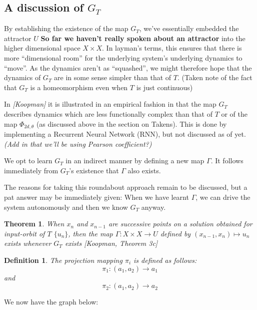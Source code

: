 \documentclass[12 pt]{article}
\newtheorem{Definition}{Definition}[]
\newtheorem{Theorem}{Theorem}[]
\begin{document}
\subsection{A discussion of $G_T$ }

By establishing the existence of the map $G_T$, we’ve essentially embedded the attractor $U$ \textbf{So far we haven't really spoken about an attractor} into the higher dimensional space $X\times{X}$.
In layman’s terms, this ensures that there is more “dimensional room” for the underlying system’s underlying dynamics to “move”. As the dynamics aren’t as “squashed”, we might therefore hope that the dynamics of $G_T$ are in some sense simpler than that of $T$. (Taken note of the fact that $G_T$ is a homeomorphism even when $T$ is just continuous)
 
In \emph{[Koopman]} it is illustrated in an empirical fashion in that the map $G_T$ describes dynamics which are less functionally complex than that of $T$ or of the map $\Phi_{2d,\theta}$ (as discussed above in the section on Takens). This is done by implementing a Recurrent Neural Network (RNN), but not discussed as of yet. \emph{(Add in that we'll be using Pearson coefficient?)}
 
We opt to learn $G_T$ in an indirect manner by defining a new map $\Gamma$. It follows immediately from $G_T$’s existence that $\Gamma$ also exists. 

The reasons for taking this roundabout approach remain to be discussed, but a pat answer may be immediately given: When we have learnt $\Gamma$, we can drive the system autonomously and then we know $G_T$ anyway.

\begin{Theorem}
  When $x_n$ and $x_{n-1}$ are successive points on a solution obtained for input-orbit of $T$ $\{u_n\}$, then the map $\Gamma: X\times{X}\to{U}$ defined by $(x_{n-1},x_n)\mapsto{u_n}$ exists whenever $G_T$ exists [Koopman, Theorem 3c] 
\end{Theorem}

\begin{Definition}
 The projection mapping $\pi_i$ is defined as follows: $$\pi_1:(a_1,a_2)\to{a_1}$$ and $$\pi_2:(a_1,a_2)\to{a_2}$$ 
\end{Definition}

We now have the graph below:
\end{document}
